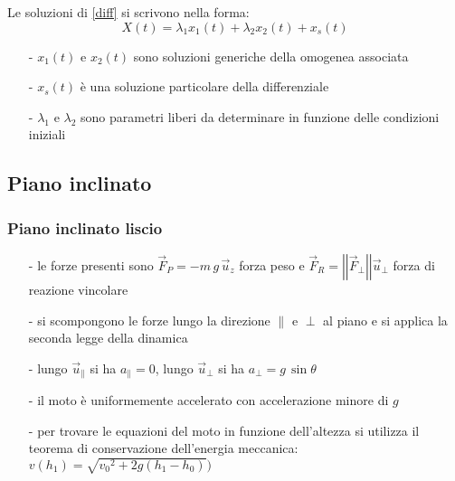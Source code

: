 \documentclass[a4paper]{article}
\newcommand\uz{\vec{u}_z}
\newcommand\uper{\vec{u}_\perp}
\newcommand\upar{\vec{u}_\parallel}
\newcommand\vmod[1]{\left|\left|{#1}\right|\right|}
\begin{document}
Le soluzioni di \eqref{diff} si scrivono nella forma:
\[X(t) = \lambda_1 x_1(t) + \lambda_2 x_2(t) + x_s(t)\]
\begin{itemize}[topsep=3pt, itemsep=0pt]
	\item[-] \(x_1(t)\) e \(x_2(t)\) sono soluzioni generiche della omogenea associata
	\item[-] \(x_s(t)\) è una soluzione particolare della differenziale
	\item[-] \(\lambda_1\) e \(\lambda_2\) sono parametri liberi da determinare in funzione delle condizioni iniziali
\end{itemize}

\subsection{Piano inclinato}
\subsubsection*{Piano inclinato liscio}
\begin{itemize}[topsep=3pt, itemsep=0pt]
	\item[-] le forze presenti sono \(\vec{F}_P = -m \, g \, \uz\) forza peso e \(\vec{F}_R = \vmod{\vec{F}_\perp} \uper\) forza di reazione vincolare
	\item[-] si scompongono le forze lungo la direzione \(\parallel\) e \(\perp\) al piano e si applica la seconda legge della dinamica
	\item[-] lungo \(\upar\) si ha \(a_\parallel = 0\), lungo \(\uper\) si ha \(a_\perp = g \, \sin \theta\)
	\item[-] il moto è uniformemente accelerato con accelerazione minore di \(g\)
	\item[-] per trovare le equazioni del moto in funzione dell'altezza si utilizza il teorema di conservazione dell'energia meccanica:
	\(v(h_1) = \sqrt{{v_0}^2 + 2g(h_1 - h_0)})\)
\end{itemize}
\end{document}
